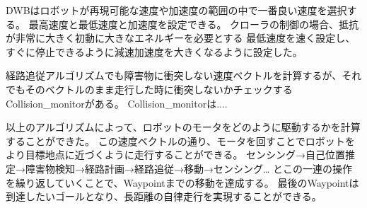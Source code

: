DWBはロボットが再現可能な速度や加速度の範囲の中で一番良い速度を選択する。
最高速度と最低速度と加速度を設定できる。
クローラの制御の場合、抵抗が非常に大きく初動に大きなエネルギーを必要とする
最低速度を速く設定し、すぐに停止できるように減速加速度を大きくなるように設定した。

経路追従アルゴリズムでも障害物に衝突しない速度ベクトルを計算するが、それでもそのベクトルのまま走行した時に衝突しないかチェックするCollision\_monitorがある。
Collision\_monitorは....

以上のアルゴリズムによって、ロボットのモータをどのように駆動するかを計算することができた。
この速度ベクトルの通り、モータを回すことでロボットをより目標地点に近づくように走行することができる。
センシング→自己位置推定→障害物検知→経路計画→経路追従→移動→センシング…
とこの一連の操作を繰り返していくことで、Waypointまでの移動を達成する。
最後のWaypointは到達したいゴールとなり、長距離の自律走行を実現することができる。